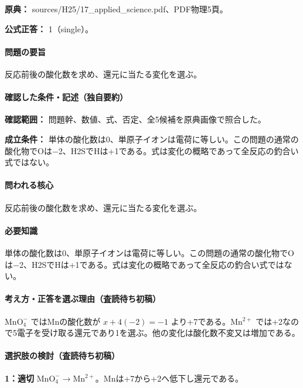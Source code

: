 \noindent\textbf{原典：} sources/H25/17\_applied\_science.pdf、PDF物理5頁。

\textbf{公式正答：} 1（single）。

\paragraph{問題の要旨} 反応前後の酸化数を求め、還元に当たる変化を選ぶ。

\paragraph{確認した条件・記述（独自要約）}\mbox{}\par

\noindent\textbf{確認範囲：} 問題幹、数値、式、否定、全5候補を原典画像で照合した。\par

\noindent\textbf{成立条件：} 単体の酸化数は0、単原子イオンは電荷に等しい。この問題の通常の酸化物でOは−2、H2SでHは+1である。式は変化の概略であって全反応の釣合い式ではない。\par

\paragraph{問われる核心} 反応前後の酸化数を求め、還元に当たる変化を選ぶ。

\paragraph{必要知識} 単体の酸化数は0、単原子イオンは電荷に等しい。この問題の通常の酸化物でOは−2、H2SでHは+1である。式は変化の概略であって全反応の釣合い式ではない。

\paragraph{考え方・正答を選ぶ理由（査読待ち初稿）} \(\mathrm{MnO_4^-}\) ではMnの酸化数が \(x+4(-2)=-1\) より+7である。\(\mathrm{Mn^{2+}}\) では+2なので5電子を受け取る還元であり1を選ぶ。他の変化は酸化数不変又は増加である。

\paragraph{選択肢の検討（査読待ち初稿）}\mbox{}\par

\noindent\textbf{1：適切} \(\mathrm{MnO_4^-}\to\mathrm{Mn^{2+}}\)。Mnは+7から+2へ低下し還元である。\par

